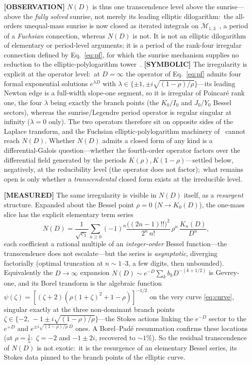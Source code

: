 \documentclass[aps,pra,twocolumn,superscriptaddress,longbibliography]{revtex4-2}
\begin{document}
\textbf{[OBSERVATION]} $N(D)$ is thus one transcendence level above the
sunrise---above the \emph{fully solved} sunrise, not merely its leading elliptic
dilogarithm:\ the all-orders unequal-mass sunrise is now closed as iterated
integrals on $\overline{\mathcal M}_{1,3}$~\cite{bognermsw2019}, a period of a
\emph{Fuchsian} connection, whereas $N(D)$ is not.  It is not an elliptic
dilogarithm of elementary or period-level arguments; it is a period of the
rank-four irregular connection defined by Eq.~\eqref{eq:pf}, for which the
sunrise mechanism supplies no reduction to the elliptic-polylogarithm
tower~\cite{bonisch2021}.  \textbf{[SYMBOLIC]} The irregularity is explicit at
the operator level:\ at $D=\infty$ the operator of Eq.~\eqref{eq:pf} admits four
formal exponential solutions $e^{\lambda D}$ with
$\lambda\in\{\pm1,\pm i\sqrt{(1-\rho)/\rho}\}$---its leading Newton edge is a
full-width slope-one segment, so it is irregular of Poincar\'e rank one, the
four $\lambda$ being exactly the branch points (the $K_{0}/I_{0}$ and
$J_{0}/Y_{0}$ Bessel sectors), whereas the sunrise/Legendre period operator is
regular singular at infinity ($\lambda=0$ only).  The two operators therefore
sit on opposite sides of the Laplace transform, and the Fuchsian
elliptic-polylogarithm machinery of~\cite{bognermsw2019} cannot reach $N(D)$.
Whether $N(D)$ admits a closed form of any kind is a differential-Galois
question---whether the fourth-order operator factors over the differential
field generated by the periods $K(\rho),K(1-\rho)$---settled below, negatively, at the
reducibility level (the operator does not factor);\ what remains open is only whether a
\emph{transcendental} closed form exists at the irreducible level.

\textbf{[MEASURED]} The same irregularity is visible in $N(D)$ itself, as a
\emph{resurgent} structure.  Expanded about the Bessel point $\rho=0$
($N\to K_{0}(D)$), the one-mass slice has the explicit elementary term series
%
\begin{equation}
  N(D) = \frac{1}{\sqrt{c_{1}}}\sum_{n\ge0}(-1)^{n}
  \frac{\big((2n-1)!!\big)^{2}}{2^{n}\,n!}\,\rho^{n}\,\frac{K_{n}(D)}{D^{n}},
\end{equation}
%
each coefficient a rational multiple of an \emph{integer-order} Bessel
function---the transcendence does not escalate---but the series is
\emph{asymptotic}, diverging factorially (optimal truncation at
$n\!\sim\!1$--$3$, a few digits, then unbounded).  Equivalently the
$D\to\infty$ expansion $N(D)\sim e^{-D}\sum_{k}b_{k}D^{-(k+1/2)}$ is
Gevrey-one, and its Borel transform is the algebraic function
$\psi(\zeta)=[(\zeta+2)(\rho(1+\zeta)^{2}+1-\rho)]^{-1/2}$ on the very curve
\eqref{eq:curve}, singular exactly at the three non-dominant branch points
$\zeta\in\{-2,\,-1\pm i\sqrt{(1-\rho)/\rho}\}$---the Stokes actions linking the
$e^{-D}$ sector to the $e^{+D}$ and $e^{\pm i\sqrt{(1-\rho)/\rho}\,D}$ ones.  A
Borel--Pad\'e resummation confirms these locations (at $\rho=\tfrac15$:\
$\zeta=-2$ and $-1\pm2i$, recovered to $\sim\!1\%$).  So the residual
transcendence of $N(D)$ is not exotic:\ it is the resurgence of an elementary
Bessel series, its Stokes data pinned to the branch points of the elliptic
curve.
\end{document}
